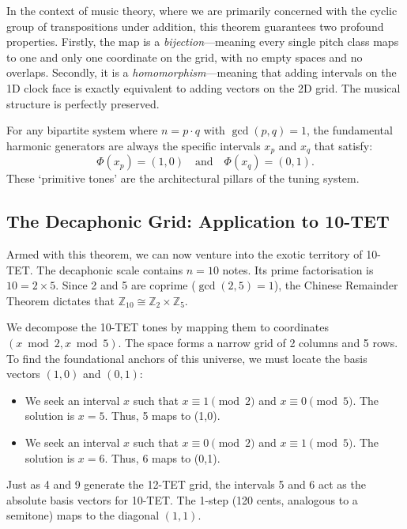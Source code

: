 \documentclass[11pt,letterpaper]{amsart}
\newcommand{\Z}{\mathbb{Z}}
\begin{document}
In the context of music theory, where we are primarily concerned with the cyclic group of transpositions under addition, this theorem guarantees two profound properties. Firstly, the map is a \textit{bijection}---meaning every single pitch class maps to one and only one coordinate on the grid, with no empty spaces and no overlaps. Secondly, it is a \textit{homomorphism}---meaning that adding intervals on the 1D clock face is exactly equivalent to adding vectors on the 2D grid. The musical structure is perfectly preserved.

For any bipartite system where $n = p \cdot q$ with $\gcd(p,q) = 1$, the fundamental harmonic generators are always the specific intervals $x_p$ and $x_q$ that satisfy:
\begin{equation}
    \Phi(x_p) = (1, 0) \quad \text{and} \quad \Phi(x_q) = (0, 1).
\end{equation}
These `primitive tones' are the architectural pillars of the tuning system.

\subsection{The Decaphonic Grid: Application to 10-TET}

Armed with this theorem, we can now venture into the exotic territory of 10-TET. The decaphonic scale contains $n=10$ notes. Its prime factorisation is $10 = 2 \times 5$. Since 2 and 5 are coprime ($\gcd(2,5)=1$), the Chinese Remainder Theorem dictates that $\Z_{10} \cong \Z_2 \times \Z_5$. 

We decompose the 10-TET tones by mapping them to coordinates $(x \bmod 2, x \bmod 5)$. The space forms a narrow grid of 2 columns and 5 rows. To find the foundational anchors of this universe, we must locate the basis vectors $(1,0)$ and $(0,1)$:
\begin{itemize}
    \item We seek an interval $x$ such that $x \equiv 1 \pmod 2$ and $x \equiv 0 \pmod 5$. The solution is $x = 5$. Thus, {\color{blue}5} maps to {\color{blue}(1,0)}.
    \item We seek an interval $x$ such that $x \equiv 0 \pmod 2$ and $x \equiv 1 \pmod 5$. The solution is $x = 6$. Thus, {\color{red}6} maps to {\color{red}(0,1)}.
\end{itemize}
Just as 4 and 9 generate the 12-TET grid, the intervals 5 and 6 act as the absolute basis vectors for 10-TET. The 1-step (120 cents, analogous to a semitone) maps to the diagonal $(1,1)$.
\end{document}
